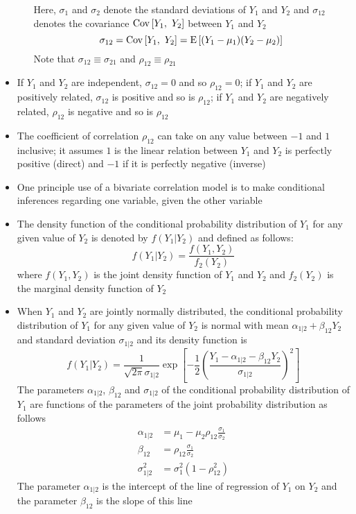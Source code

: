 \begin{itemize}
\begin{itemize}
Here, $\sigma_1$ and $\sigma_2$ denote the standard deviations of $Y_1$ and $Y_2$ and $\sigma_{12}$ denotes the covariance $\mathrm{Cov}\left[ Y_1,~Y_2\right]$ between $Y_1$ and $Y_2$ $$ \sigma_{12} = \mathrm{Cov}\left[ Y_1,~Y_2\right] = \mathrm{E}\left[ (Y_1 - \mu_1)(Y_2 - \mu_2) \right] $$ Note that $\sigma_{12} \equiv \sigma_{21}$ and $\rho_{12} \equiv \rho_{21}$ \end{itemize} 
\item If $Y_1$ and $Y_2$ are independent, $\sigma_{12} = 0$ and so $\rho_{12} = 0$; if $Y_1$ and $Y_2$ are positively related, $\sigma_{12}$ is positive and so is $\rho_{12}$; if $Y_1$ and $Y_2$ are negatively related, $\rho_{12}$ is negative and so is $\rho_{12}$
\item The coefficient of correlation $\rho_{12}$ can take on any value between $-1$ and $1$ inclusive; it assumes $1$ is the linear relation between $Y_1$ and $Y_2$ is perfectly positive (direct) and $-1$ if it is perfectly negative (inverse) 
\item One principle use of a bivariate correlation model is to make conditional inferences regarding one variable, given the other variable
\item The density function of the conditional probability distribution of $Y_1$ for any given value of $Y_2$ is denoted by $f(Y_1 |Y_2)$ and defined as follows: $$ f(Y_1|Y_2) = \frac{f(Y_1, Y_2)}{f_2(Y_2)} $$ where $f(Y_1, Y_2)$ is the joint density function of $Y_1$ and $Y_2$ and $f_2(Y_2)$ is the marginal density function of $Y_2$
\item When $Y_1$ and $Y_2$ are jointly normally distributed, the conditional probability distribution of $Y_1$ for any given value of $Y_2$ is normal with mean $\alpha_{1|2} + \beta_{12}Y_2$ and standard deviation $\sigma_{1|2}$ and its density function is $$ f(Y_1|Y_2) = \frac{1}{\sqrt{2\pi} \sigma_{1|2}} \exp\left[-\frac{1}{2} \left( \frac{Y_1 - \alpha_{1|2} - \beta_{12}Y_2}{\sigma_{1|2}}\right)^2\right] $$ 
The parameters $\alpha_{1|2}$, $\beta_{12}$ and $\sigma_{1|2}$ of the conditional probability distribution of $Y_1$ are functions of the parameters of the joint probability distribution as follows $$ \begin{aligned} 
\alpha_{1|2} &= \mu_1 - \mu_2\rho_{12}\frac{\sigma_1}{\sigma_2} \\ \beta_{12} &= \rho_{12}\frac{\sigma_1}{\sigma_2} \\ \sigma^2_{1|2} &= \sigma_1^2(1 - \rho^2_{12}) \end{aligned} $$ 
The parameter $\alpha_{1|2}$ is the intercept of the line of regression of $Y_1$ on $Y_2$ and the parameter $\beta_{12}$ is the slope of this line

\end{itemize}
